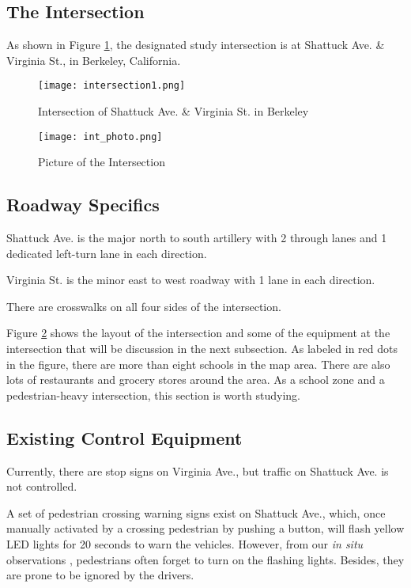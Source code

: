 \documentclass{article}
\begin{document}
\subsection{The Intersection}
As shown in Figure \ref{fig:intersect}, the designated study intersection is at Shattuck Ave. \& Virginia St., in Berkeley, California. 

\begin{figure}
    \centering
    \texttt{[image: intersection1.png]}
    \caption{Intersection of Shattuck Ave. \& Virginia St. in Berkeley}
    \label{fig:intersect}
\end{figure}

\begin{figure}
    \centering
    \texttt{[image: int\_photo.png]}
    \caption{Picture of the Intersection}
    \label{fig:intersect_pic}
\end{figure}

\subsection{Roadway Specifics}
Shattuck Ave. is the major north to south artillery with 2 through lanes and 1 dedicated left-turn lane in each direction.

Virginia St. is the minor east to west roadway with 1 lane in each direction.

There are crosswalks on all four sides of the intersection.

Figure \ref{fig:intersect_pic} shows the layout of the intersection and some of the equipment at the intersection that will be discussion in the next subsection. As labeled in red dots in the figure, there are more than eight schools in the map area. There are also lots of restaurants and grocery stores around the area. As a school zone and a pedestrian-heavy intersection, this section is worth studying.

\subsection{Existing Control Equipment}
Currently, there are stop signs on Virginia Ave., but traffic on Shattuck Ave. is not controlled.

A set of pedestrian crossing warning signs exist on Shattuck Ave., which, once manually activated by a crossing pedestrian by pushing a button, will flash yellow LED lights for 20 seconds to warn the vehicles. However, from our \textit{in situ} observations , pedestrians often forget to turn on the flashing lights. Besides, they are prone to be ignored by the drivers. 
\end{document}
